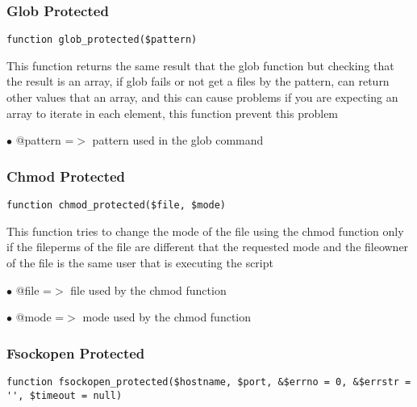 \documentclass[a4paper]{article}
\begin{document}
\hypertarget{toc138}{}
\subsubsection{Glob Protected}

\begin{lstlisting}
function glob_protected($pattern)
\end{lstlisting}

This function returns the same result that the glob function but checking
that the result is an array, if glob fails or not get a files by the pattern,
can return other values that an array, and this can cause problems if you are
expecting an array to iterate in each element, this function prevent this
problem

\begin{compactitem}
\item[\color{myblue}$\bullet$] @pattern =$>$ pattern used in the glob command
\end{compactitem}

\hypertarget{toc139}{}
\subsubsection{Chmod Protected}

\begin{lstlisting}
function chmod_protected($file, $mode)
\end{lstlisting}

This function tries to change the mode of the file using the chmod function
only if the fileperms of the file are different that the requested mode and
the fileowner of the file is the same user that is executing the script

\begin{compactitem}
\item[\color{myblue}$\bullet$] @file =$>$ file used by the chmod function
\item[\color{myblue}$\bullet$] @mode =$>$ mode used by the chmod function
\end{compactitem}

\hypertarget{toc140}{}
\subsubsection{Fsockopen Protected}

\begin{lstlisting}
function fsockopen_protected($hostname, $port, &$errno = 0, &$errstr = '', $timeout = null)
\end{lstlisting}
\end{document}
